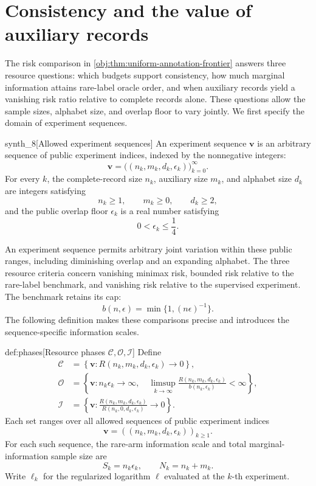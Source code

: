 \section{Consistency and the value of auxiliary records}

The risk comparison in \cref{obj:thm:uniform-annotation-frontier} answers three resource questions: which budgets support consistency, how much marginal information attains rare-label oracle order, and when auxiliary records yield a vanishing risk ratio relative to complete records alone. These questions allow the sample sizes, alphabet size, and overlap floor to vary jointly. We first specify the domain of experiment sequences.

\begin{definitionv}{synth_8}[Allowed experiment sequences]
An experiment sequence \(\mathbf v\) is an arbitrary sequence of public experiment indices, indexed by the nonnegative integers:
\[
\mathbf v=\bigl((n_k,m_k,d_k,\epsilon_k)\bigr)_{k=0}^{\infty}.
\]
For every \(k\), the complete-record size \(n_k\), auxiliary size \(m_k\), and alphabet size \(d_k\) are integers satisfying
\[
n_k\ge 1,\qquad m_k\ge 0,\qquad d_k\ge 2,
\]
and the public overlap floor \(\epsilon_k\) is a real number satisfying
\[
0<\epsilon_k\le \frac14.
\]
\end{definitionv}

An experiment sequence  permits arbitrary joint variation within these public ranges, including diminishing overlap and an expanding alphabet. The three resource criteria concern vanishing minimax risk, bounded risk relative to the rare-label benchmark, and vanishing risk relative to the supervised experiment. The benchmark retains its cap:
\[
b(n,\epsilon)=\min\{1,(n\epsilon)^{-1}\}.
\]
The following definition makes these comparisons precise and introduces the sequence-specific information scales.

\begin{definitionv}{def:phases}[Resource phases \(\mathcal C,\mathcal O,\mathcal I\)]
Define
\[
\begin{aligned}
\mathcal C
&=\left\{\mathbf v:
R(n_k,m_k,d_k,\epsilon_k)\longrightarrow 0\right\},\\
\mathcal O
&=\left\{\mathbf v:
n_k\epsilon_k\longrightarrow\infty,\quad
\limsup_{k\to\infty}
\frac{R(n_k,m_k,d_k,\epsilon_k)}{b(n_k,\epsilon_k)}
<\infty\right\},\\
\mathcal I
&=\left\{\mathbf v:
\frac{R(n_k,m_k,d_k,\epsilon_k)}
{R(n_k,0,d_k,\epsilon_k)}
\longrightarrow 0\right\}.
\end{aligned}
\]
Each set ranges over all allowed sequences of public experiment indices
\[
\mathbf v=((n_k,m_k,d_k,\epsilon_k))_{k\ge1}.
\]
For each such sequence, the rare-arm information scale and total marginal-information sample size are
\[
S_k=n_k\epsilon_k,\qquad N_k=n_k+m_k.
\]
Write \(\ell_k\) for the regularized logarithm \(\ell\) evaluated at the \(k\)-th experiment.
\end{definitionv}

